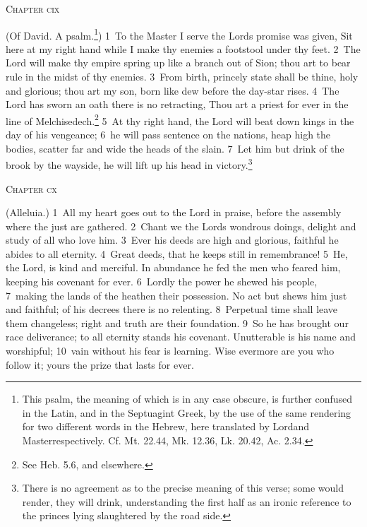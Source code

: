 \documentclass[10pt]{book} %
\begin{document}
\begin{large}\begin{center}\textsc{Chapter cix}\end{center}\end{large}
(Of David. A psalm.\footnote[1]{This psalm, the meaning of which is in any case obscure, is further confused in the Latin, and in the Septuagint Greek, by the use of the same rendering for two different words in the Hebrew, here translated by \textasciigrave Lord\textquotesingle  and \textasciigrave Master\textquotesingle  respectively. Cf. Mt. 22.44, Mk. 12.36, Lk. 20.42, Ac. 2.34.})
\textcolor{benred8}{1}~To the Master I serve the Lord\textquotesingle s promise was given, Sit here at my right hand while I make thy enemies a footstool under thy feet. \textcolor{benred8}{2}~The Lord will make thy empire spring up like a branch out of Sion; thou art to bear rule in the midst of thy enemies. \textcolor{benred8}{3}~From birth, princely state shall be thine, holy and glorious; thou art my son, born like dew before the day-star rises. \textcolor{benred8}{4}~The Lord has sworn an oath there is no retracting, Thou art a priest for ever in the line of Melchisedech.\footnote[2]{See Heb. 5.6, and elsewhere.} \textcolor{benred8}{5}~At thy right hand, the Lord will beat down kings in the day of his vengeance; \textcolor{benred8}{6}~he will pass sentence on the nations, heap high the bodies, scatter far and wide the heads of the slain. \textcolor{benred8}{7}~Let him but drink of the brook by the wayside, he will lift up his head in victory.\footnote[3]{There is no agreement as to the precise meaning of this verse; some would render, \textasciigrave they will drink\textquotesingle , understanding the first half as an ironic reference to the princes lying slaughtered by the road side.}
\begin{large}\begin{center}\textsc{Chapter cx}\end{center}\end{large}
(Alleluia.)
\textcolor{benred8}{1}~All my heart goes out to the Lord in praise, before the assembly where the just are gathered. \textcolor{benred8}{2}~Chant we the Lord\textquotesingle s wondrous doings, delight and study of all who love him. \textcolor{benred8}{3}~Ever his deeds are high and glorious, faithful he abides to all eternity. \textcolor{benred8}{4}~Great deeds, that he keeps still in remembrance! \textcolor{benred8}{5}~He, the Lord, is kind and merciful. In abundance he fed the men who feared him, keeping his covenant for ever. \textcolor{benred8}{6}~Lordly the power he shewed his people, \textcolor{benred8}{7}~making the lands of the heathen their possession. No act but shews him just and faithful; of his decrees there is no relenting. \textcolor{benred8}{8}~Perpetual time shall leave them changeless; right and truth are their foundation. \textcolor{benred8}{9}~So he has brought our race deliverance; to all eternity stands his covenant. Unutterable is his name and worshipful; \textcolor{benred8}{10}~vain without his fear is learning. Wise evermore are you who follow it; yours the prize that lasts for ever.
\end{document}
